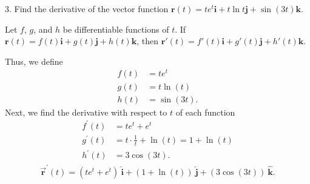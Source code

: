 \documentclass{report}
\begin{document}
    \bigbreak \noindent 
    \begin{mdframed}
        3. Find the derivative of the vector function $\mathbf{r}(t) = t e^t \mathbf{i} + t \ln t \mathbf{j} + \sin(3t) \mathbf{k}$.
    \end{mdframed}
    \bigbreak \noindent 
    \begin{remark}
        Let $f$, $g$, and $h$ be differentiable functions of $t$. If $\mathbf{r}(t) = f(t)\mathbf{i} + g(t)\mathbf{j} + h(t)\mathbf{k}$, then $\mathbf{r}'(t) = f'(t)\mathbf{i} + g'(t)\mathbf{j} + h'(t)\mathbf{k}$.
    \end{remark}
    \bigbreak \noindent 
    Thus, we define
    \begin{align*}
        f(t) &= te^{t} \\
        g(t) &= t\ln{(t)} \\
        h(t) &= \sin{\left(3t\right)}
    .\end{align*}
    Next, we find the derivative with respect to $t$ of each function
    \begin{align*}
        f^{\prime}(t) &= te^{t} + e^{t} \\
        g^{\prime}(t) &= t \cdot \frac{1}{t} + \ln{(t)} = 1 + \ln{(t)} \\
        h^{\prime}(t) &=3\cos{\left(3t\right)}
    .\end{align*}
    \bigbreak \noindent 
        \begin{align*}
            \vec{\mathbf{r}}^{\prime}(t) = (te^{t} + e^{t})\ \hat{\mathbf{i}} + (1+\ln{(t)})\ \hat{\mathbf{j}} + (3\cos{\left(3t\right)})\ \hat{\mathbf{k}}
        .\end{align*}
\end{document}
